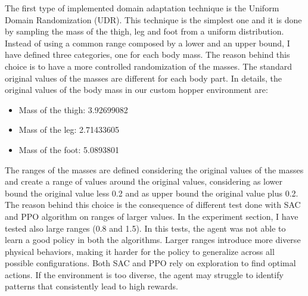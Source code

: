 \documentclass[12pt]{article}
\begin{document}
The first type of implemented domain adaptation technique is the Uniform Domain Randomization (UDR). This technique is the simplest one and it is done by sampling the mass of the thigh, leg and foot from a uniform distribution. Instead of using a common range composed by a lower and an upper bound, I have defined three categories, one for each body mass. The reason behind this choice is to have a more controlled randomization of the masses. The standard original values of the masses are different  for each body part. In details, the original values of the body mass in our custom hopper environment are:
\begin{itemize}
    \item Mass of the thigh: 3.92699082
    \item Mass of the leg: 2.71433605
    \item Mass of the foot: 5.0893801
\end{itemize}

The ranges of the masses are defined considering the original values of the masses and create a range of values around the original values, considering as lower bound the original value less 0.2 and as upper bound the original value plus 0.2. The reason behind this choice is the consequence of different test done with SAC and PPO algorithm on ranges of larger values. In the experiment section, I have tested also large ranges (0.8 and 1.5).  In this tests, the agent was not able to learn a good policy in both the algorithms. Larger ranges introduce more diverse physical behaviors, making it harder for the policy to generalize across all possible configurations. Both SAC and PPO rely on exploration to find optimal actions. If the environment is too diverse, the agent may struggle to identify patterns that consistently lead to high rewards.
\end{document}
